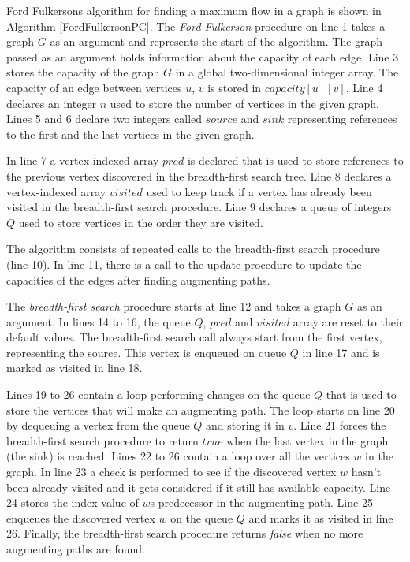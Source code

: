 \documentclass{l4proj}
\begin{document}
\noindent Ford Fulkerson\textquotesingle s algorithm \cite{ford1956maximal} for finding a maximum flow in a graph is shown in Algorithm \ref{FordFulkersonPC}. The \textit{Ford Fulkerson} procedure on line 1 takes a graph $G$ as an argument and represents the start of the algorithm. The graph passed as an argument holds information about the capacity of each edge. Line 3 stores the capacity of the graph $G$ in a global two-dimensional integer array. The capacity of an edge between vertices $u$, $v$ is stored in $capacity[u][v]$. Line 4 declares an integer $n$ used to store the number of vertices in the given graph. Lines 5 and 6 declare two integers called $source$ and $sink$ representing references to the first and the last vertices in the given graph.

\noindent In line 7 a vertex-indexed array $pred$ is declared that is used to store references to the previous vertex discovered in the breadth-first search tree. Line 8 declares a vertex-indexed array $visited$ used to keep track if a vertex has already been visited in the breadth-first search procedure. Line 9 declares a queue of integers $Q$ used to store vertices in the order they are visited.

\noindent The algorithm consists of repeated calls to the breadth-first search procedure (line 10). In line 11, there is a call to the update procedure to update the capacities of the edges after finding augmenting paths.

\noindent The \textit{breadth-first search} procedure starts at line 12 and takes a graph $G$ as an argument. In lines 14 to 16, the queue $Q$, $pred$ and $visited$ array are reset to their default values. The breadth-first search call always start from the first vertex, representing the source. This vertex is enqueued on queue $Q$ in line 17 and is marked as visited in line 18.

\noindent Lines 19 to 26 contain a loop performing changes on the queue $Q$ that is used to store the vertices that will make an augmenting path. The loop starts on line 20 by dequeuing a vertex from the queue $Q$ and storing it in $v$. Line 21 forces the breadth-first search procedure to return $true$ when the last vertex in the graph (the sink) is reached. Lines 22 to 26 contain a loop over all the vertices $w$ in the graph. In line 23 a check is performed to see if the discovered vertex $w$ hasn't been already visited and it gets considered if it still has available capacity. Line 24 stores the index value of $w$\textquotesingle s predecessor in the augmenting path. Line 25 enqueues the discovered vertex $w$ on the queue $Q$ and marks it as visited in line 26. Finally, the breadth-first search procedure returns \textit{false} when no more augmenting paths are found.
\end{document}
